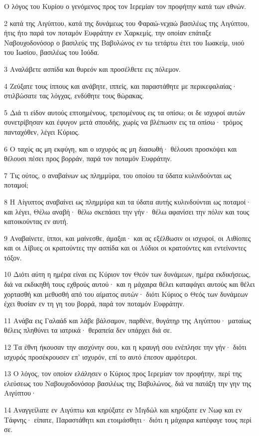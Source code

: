 \par Ο λόγος του Κυρίου ο γενόμενος προς τον Ιερεμίαν τον προφήτην κατά των εθνών.
\par 2 κατά της Αιγύπτου, κατά της δυνάμεως του Φαραώ-νεχαώ βασιλέως της Αιγύπτου, ήτις ήτο παρά τον ποταμόν Ευφράτην εν Χαρκεμίς, την οποίαν επάταξε Ναβουχοδονόσορ ο βασιλεύς της Βαβυλώνος εν τω τετάρτω έτει του Ιωακείμ, υιού του Ιωσίου, βασιλέως του Ιούδα.
\par 3 Αναλάβετε ασπίδα και θυρεόν και προσέλθετε εις πόλεμον.
\par 4 Ζεύξατε τους ίππους και ανάβητε, ιππείς, και παραστάθητε με περικεφαλαίας· στιλβώσατε τας λόγχας, ενδύθητε τους θώρακας.
\par 5 Διά τι είδον αυτούς επτοημένους, τρεπομένους εις τα οπίσω; οι δε ισχυροί αυτών συνετρίβησαν και έφυγον μετά σπουδής, χωρίς να βλέπωσιν εις τα οπίσω· τρόμος πανταχόθεν, λέγει Κύριος.
\par 6 Ο ταχύς ας μη εκφύγη, και ο ισχυρός ας μη διασωθή· θέλουσι προσκόψει και θέλουσι πέσει προς βορράν, παρά τον ποταμόν Ευφράτην.
\par 7 Τις ούτος, ο αναβαίνων ως πλημμύρα, του οποίου τα ύδατα κυλινδούνται ως ποταμοί;
\par 8 Η Αίγυπτος αναβαίνει ως πλημμύρα και τα ύδατα αυτής κυλινδούνται ως ποταμοί· και λέγει, Θέλω αναβή· θέλω σκεπάσει την γήν· θέλω αφανίσει την πόλιν και τους κατοικούντας εν αυτή.
\par 9 Αναβαίνετε, ίπποι, και μαίνεσθε, άμαξαι· και ας εξέλθωσιν οι ισχυροί, οι Αιθίοπες και οι Λίβυες οι κρατούντες την ασπίδα και οι Λύδιοι οι κρατούντες και εντείνοντες τόξον.
\par 10 Διότι αύτη η ημέρα είναι εις Κύριον τον Θεόν των δυνάμεων, ημέρα εκδικήσεως, διά να εκδικηθή τους εχθρούς αυτού· και η μάχαιρα θέλει καταφάγει αυτούς και θέλει χορτασθή και μεθυσθή από του αίματος αυτών· διότι Κύριος ο Θεός των δυνάμεων έχει θυσίαν εν τη γη του βορρά, παρά τον ποταμόν Ευφράτην.
\par 11 Ανάβα εις Γαλαάδ και λάβε βάλσαμον, παρθένε, θυγάτηρ της Αιγύπτου· ματαίως θέλεις πληθύνει τα ιατρικά· θεραπεία δεν υπάρχει διά σε.
\par 12 Τα έθνη ήκουσαν την αισχύνην σου, και η κραυγή σου ενέπλησε την γήν· διότι ισχυρός προσέκρουσεν επ' ισχυρόν, επί το αυτό έπεσον αμφότεροι.
\par 13 Ο λόγος, τον οποίον ελάλησεν ο Κύριος προς Ιερεμίαν τον προφήτην, περί της ελεύσεως του Ναβουχοδονόσορ βασιλέως της Βαβυλώνος, διά να πατάξη την γην της Αιγύπτου·
\par 14 Αναγγείλατε εν Αιγύπτω και κηρύξατε εν Μιγδώλ και κηρύξατε εν Νωφ και εν Τάφνης· είπατε, Παραστάθητι και ετοιμάσθητι· διότι η μάχαιρα κατέφαγε τους περί σε.
